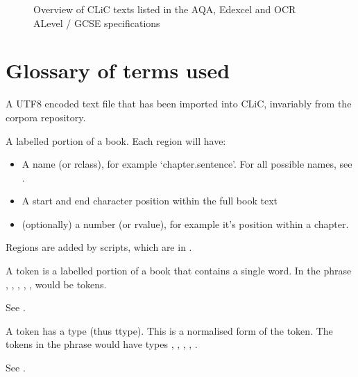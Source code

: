 \documentclass[letterpaper,10pt,english]{sphinxmanual}
\begin{document}
\begin{figure}[htbp]
\centering
\capstart

\noindent{}
\caption{Overview of CLiC texts listed in the AQA, Edexcel and OCR
A\sphinxhyphen{}Level / GCSE specifications}\label{\detokenize{appendices:id7}}\end{figure}
\label{\detokenize{glossary::doc}}

\chapter{Glossary of terms used}
\label{\detokenize{glossary:glossary-of-terms-used}}\begin{description}
\sphinxAtStartPar
A UTF\sphinxhyphen{}8 encoded text file that has been imported into CLiC, invariably from the corpora repository.

\sphinxAtStartPar
A labelled portion of a book. Each region will have:
\begin{itemize}
\item {} 
\sphinxAtStartPar
A name (or rclass), for example ‘chapter.sentence’. For all possible names, see .

\item {} 
\sphinxAtStartPar
A start and end character position within the full book text

\item {} 
\sphinxAtStartPar
(optionally) a number (or rvalue), for example it’s position within a chapter.

\end{itemize}

\sphinxAtStartPar
Regions are added by  scripts, which are in .

\sphinxAtStartPar
A token is a labelled portion of a book that contains a single word.
In the phrase , , , , ,  would be tokens.

\sphinxAtStartPar
See .

\sphinxAtStartPar
A token has a type (thus ttype). This is a normalised form of the token.
The tokens in the phrase  would have types , , , , .

\sphinxAtStartPar
See .

\end{description}
\end{document}
